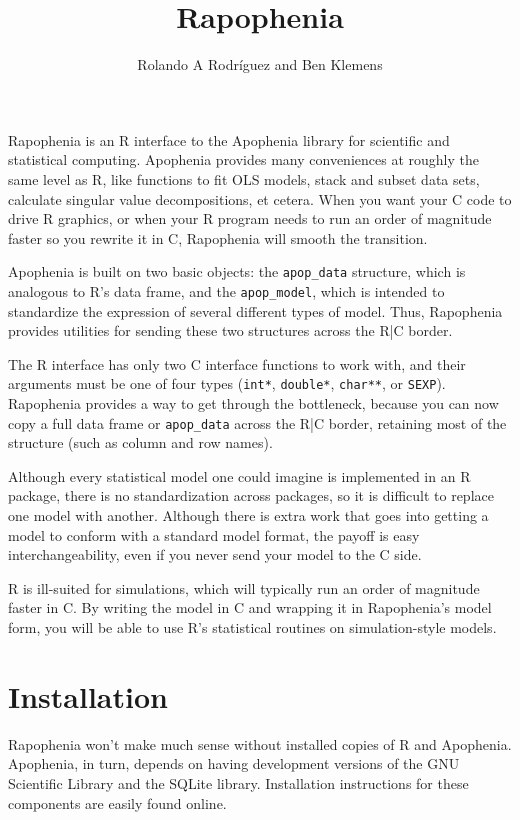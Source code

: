 \documentclass{article}
\begin{document}
\author{Rolando A Rodr\'iguez and Ben Klemens}
\title{Rapophenia}
\def\ad{{\tt apop\_data}\xspace}
\def\am{{\tt apop\_model}\xspace}
\maketitle

Rapophenia is an R interface to the Apophenia library for scientific and statistical
computing. Apophenia provides many conveniences at roughly the same level as R,
like functions to fit OLS models, stack and subset data sets, calculate singular
value decompositions, et cetera. When you want your C code to drive R graphics, or
when your R program needs to run an order of magnitude faster so you rewrite it in C,
Rapophenia will smooth the transition.

Apophenia is built on two basic objects: the \ad structure, which is
analogous to R's data frame, and the \am, which is intended to standardize
the expression of several different types of model. Thus, Rapophenia provides utilities
for sending these two structures across the R|C border.

The R interface has only two C interface functions to work with, and their arguments
must be one of four types ({\tt int*}, {\tt double*}, {\tt char**}, or {\tt SEXP}).
Rapophenia provides a way to get through the bottleneck, because you can now copy a
full data frame or \ad across the R|C border, retaining most of the structure (such as
column and row names).

Although every statistical model one could imagine is implemented in an R package, there
is no standardization across packages, so it is difficult to replace one model with
another. Although there is extra work that goes into getting a model to conform with a
standard model format, the payoff is easy interchangeability, even if you never send your
model to the C side. 

R is ill-suited for simulations, which will typically run an order of magnitude faster in
C. By writing the model in C and wrapping it in Rapophenia's model form, you will be able
to use R's statistical routines on simulation-style models.

\section{Installation} Rapophenia won't make much sense without installed copies of R and
Apophenia. Apophenia, in turn, depends on having development versions of the GNU
Scientific Library and the SQLite library. Installation instructions for these components
are easily found online.
\end{document}

